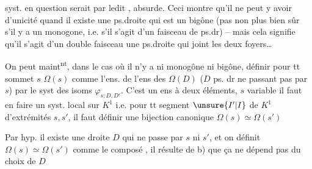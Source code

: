 syst.  en question serait  par ledit ,
absurde. Ceci montre qu'il ne peut y avoir d'unicité quand il existe une ps.droite qui est
un bigône (pas non plus bien sûr s'il y a
un monogone, i.e. s'il s'agit d'un faisceau
de ps.dr) -- mais cela signifie  qu'il
s'agit d'un double faisceau  une ps.droite qui joint les deux foyers\ldots

On peut maint\textsuperscript{nt}, dans le cas où il n'y a
ni monogône ni bigône, définir pour tt sommet $s$ $\Omega(s)$ comme l'ens.  de l'ens
des $\Omega(D)$ ($D$ ps. dr ne passant pas par $s$)
par le syst des isoms $\varphi_{s;D,D'}$. C'est un ens
à deux éléments,  $s$ variable il faut en
faire un syst. local sur $K^1$ i.e. pour
tt segment $\unsure{I'|I}$ de $K^1$ d'extrémités $s,s'$, il faut
définir une bijection canonique $\Omega(s)\simeq\Omega(s')$

Par hyp. il existe une droite $D$ qui ne passe
par $s$ ni $s'$, et  on définit $\Omega(s)\simeq\Omega(s')$ comme
le composé
, il résulte de b) que ça ne dépend pas du choix de $D$
